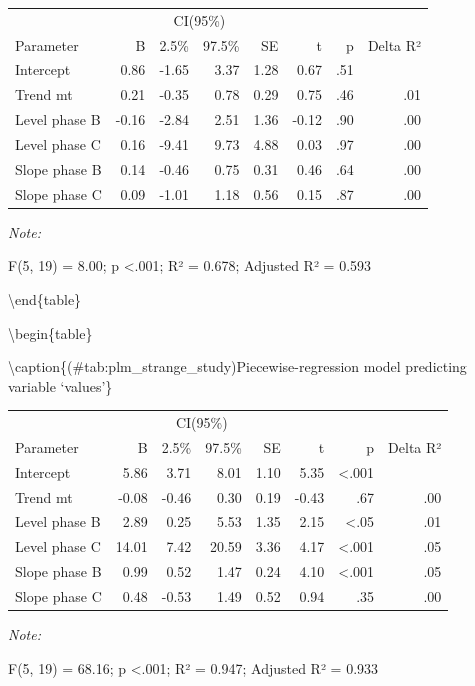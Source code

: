 \documentclass[
]{book}
\begin{document}
\begin{threeparttable}
\begin{tabular}[t]{lrrrrrrr}
\toprule
\multicolumn{2}{c}{ } & \multicolumn{2}{c}{CI(95\%)} & \multicolumn{4}{c}{ } \\
\cmidrule(l{3pt}r{3pt}){3-4}
Parameter & B & 2.5\% & 97.5\% & SE & t & p & Delta R²\\
\midrule
Intercept & 0.86 & -1.65 & 3.37 & 1.28 & 0.67 & .51 & \\
Trend mt & 0.21 & -0.35 & 0.78 & 0.29 & 0.75 & .46 & .01\\
Level phase B & -0.16 & -2.84 & 2.51 & 1.36 & -0.12 & .90 & .00\\
Level phase C & 0.16 & -9.41 & 9.73 & 4.88 & 0.03 & .97 & .00\\
Slope phase B & 0.14 & -0.46 & 0.75 & 0.31 & 0.46 & .64 & .00\\
Slope phase C & 0.09 & -1.01 & 1.18 & 0.56 & 0.15 & .87 & .00\\
\bottomrule
\end{tabular}
\begin{tablenotes}
\item \textit{Note: } 
\item F(5, 19) = 8.00; p <.001; R² = 0.678; Adjusted R² = 0.593
\end{tablenotes}
\end{threeparttable}

\textbackslash end\{table\}

\textbackslash begin\{table\}

\textbackslash caption\{(\#tab:plm\_strange\_study)Piecewise-regression model predicting variable `values'\}
\centering

\begin{threeparttable}
\begin{tabular}[t]{lrrrrrrr}
\toprule
\multicolumn{2}{c}{ } & \multicolumn{2}{c}{CI(95\%)} & \multicolumn{4}{c}{ } \\
\cmidrule(l{3pt}r{3pt}){3-4}
Parameter & B & 2.5\% & 97.5\% & SE & t & p & Delta R²\\
\midrule
Intercept & 5.86 & 3.71 & 8.01 & 1.10 & 5.35 & <.001 & \\
Trend mt & -0.08 & -0.46 & 0.30 & 0.19 & -0.43 & .67 & .00\\
Level phase B & 2.89 & 0.25 & 5.53 & 1.35 & 2.15 & <.05 & .01\\
Level phase C & 14.01 & 7.42 & 20.59 & 3.36 & 4.17 & <.001 & .05\\
Slope phase B & 0.99 & 0.52 & 1.47 & 0.24 & 4.10 & <.001 & .05\\
Slope phase C & 0.48 & -0.53 & 1.49 & 0.52 & 0.94 & .35 & .00\\
\bottomrule
\end{tabular}
\begin{tablenotes}
\item \textit{Note: } 
\item F(5, 19) = 68.16; p <.001; R² = 0.947; Adjusted R² = 0.933
\end{tablenotes}
\end{threeparttable}
\end{document}
